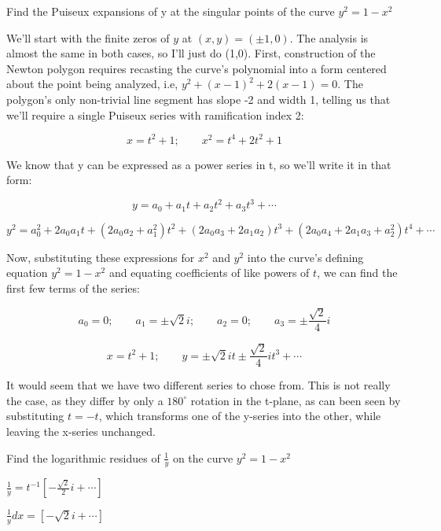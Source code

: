 \example Find the Puiseux expansions of y at the singular points of the
curve $y^2 = 1 - x^2$

We'll start with the finite zeros of $y$ at $(x,y)=(\pm 1, 0)$.  The
analysis is almost the same in both cases, so I'll just do (1,0).
First, construction of the Newton polygon requires recasting the
curve's polynomial into a form centered about the point being
analyzed, i.e, $y^2 + (x-1)^2 + 2(x-1) = 0$.  The polygon's only
non-trivial line segment has slope -2 and width 1, telling us that
we'll require a single Puiseux series with ramification index 2:

$$x=t^2+1; \qquad x^2=t^4+2t^2+1$$

We know that y can be expressed as a power series in t, so we'll write
it in that form:

$$y=a_0 + a_1 t + a_2 t^2 + a_3 t^3 + \cdots$$

$$y^2 = a_0^2 + 2 a_0 a_1 t + (2 a_0 a_2 + a_1^2) t^2 + (2 a_0 a_3 + 2 a_1 a_2) t^3 + (2 a_0 a_4 + 2 a_1 a_3 + a_2^2) t^4 + \cdots$$

Now, substituting these expressions for $x^2$ and $y^2$ into the
curve's defining equation $y^2 = 1 - x^2$ and equating coefficients
of like powers of $t$, we can find the first few terms of the series:

$$a_0=0; \qquad a_1 = \pm\sqrt{2}i; \qquad a_2 = 0; \qquad a_3 = \pm \frac{\sqrt{2}}{4} i$$

$$x = t^2 +1; \qquad y = \pm\sqrt{2}it \pm \frac{\sqrt{2}}{4} it^3 + \cdots$$

It would seem that we have two different series to chose from.  This
is not really the case, as they differ by only a $180^\circ$ rotation
in the t-plane, as can been seen by substituting $t=-t$, which
transforms one of the y-series into the other, while leaving the
x-series unchanged.

\endexample

\example Find the logarithmic residues of $\frac{1}{y}$ on the curve
$y^2 = 1 - x^2$


$\frac{1}{y} = t^{-1} \left[ -\frac{\sqrt{2}}{2}i + \cdots \right]$

$\frac{1}{y} dx = \left[ -\sqrt{2}i + \cdots \right] $

\endexample
